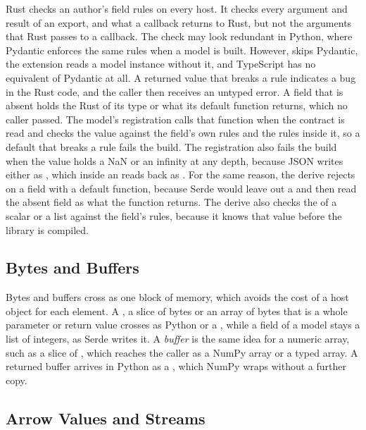 \documentclass[sigconf,nonacm]{acmart}
\begin{document}
Rust checks an author's field rules on every host. It checks every argument and result of an export, and what a callback returns to Rust, but not the arguments that Rust passes to a callback. The check may look redundant in Python, where Pydantic enforces the same rules when a model is built. However,  skips Pydantic, the extension reads a model instance without it, and TypeScript has no equivalent of Pydantic at all. A returned value that breaks a rule indicates a bug in the Rust code, and the caller then receives an untyped error. A field that is absent holds the Rust  of its type or what its default function returns, which no caller passed. The model's registration calls that function when the contract is read and checks the value against the field's own rules and the rules inside it, so a default that breaks a rule fails the build. The registration also fails the build when the value holds a NaN or an infinity at any depth, because JSON writes either as , which inside an  reads back as . For the same reason, the derive rejects  on a field with a default function, because Serde would leave out a  and then read the absent field as what the function returns. The derive also checks the  of a scalar or a list against the field's rules, because it knows that value before the library is compiled.

\subsection{Bytes and Buffers}

Bytes and buffers cross as one block of memory, which avoids the cost of a host object for each element. A , a slice of bytes or an array of bytes that is a whole parameter or return value crosses as Python  or a , while a  field of a model stays a list of integers, as Serde writes it. A \emph{buffer} is the same idea for a numeric array, such as a slice of , which reaches the caller as a NumPy array or a typed array. A returned buffer arrives in Python as a , which NumPy wraps without a further copy.

\subsection{Arrow Values and Streams}
\end{document}
